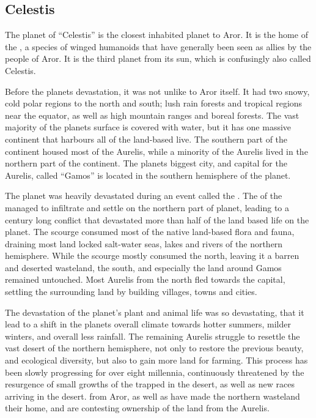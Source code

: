\subsection{Celestis}
\label{sec:Celestis}

The planet of ``Celestis'' is the closest inhabited planet to Aror. It is the
home of the , a species of winged humanoids that have
generally been seen as allies by the people of Aror. It is the third planet
from its sun, which is confusingly also called Celestis.

Before the planets devastation, it was not unlike to Aror itself. It had two
snowy, cold polar regions to the north and south; lush rain forests and tropical
regions near the equator, as well as high mountain ranges and boreal forests.
The vast majority of the planets surface is covered with water, but it has one
massive continent that harbours all of the land-based live. The southern part
of the continent housed most of the Aurelis, while a minority of the Aurelis
lived in the northern part of the continent. The planets biggest city, and
capital for the Aurelis, called ``Gamos'' is located in the southern
hemisphere of the planet.

The planet was heavily devastated during an event called the . The  of the  managed to
infiltrate and settle on the northern part of planet, leading to a century
long conflict that devastated more than half of the land based life on the
planet. The scourge consumed most of the native land-based flora and fauna,
draining most land locked salt-water seas, lakes and rivers of the northern
hemisphere. While the scourge mostly consumed the north, leaving it a barren
and deserted wasteland, the south, and especially the land around Gamos
remained untouched. Most Aurelis from the north fled towards the capital,
settling the surrounding land by building villages, towns and cities.

The devastation of the planet's plant and animal life was so devastating, that
it lead to a shift in the planets overall climate towards hotter summers,
milder winters, and overall less rainfall. The remaining Aurelis struggle to
resettle the vast desert of the northern hemisphere, not only to restore the
previous beauty, and ecological diversity, but also to gain more land for
farming. This process has been slowly progressing for over eight millennia,
continuously threatened by the resurgence of small growths of the
 trapped in the desert, as well as new races arriving in
the desert.  from Aror, as well as 
have made the northern wasteland their home, and are contesting ownership of
the land from the Aurelis.

